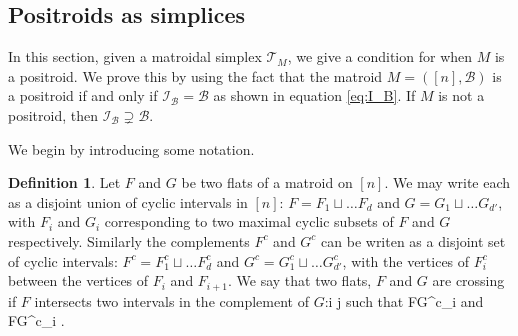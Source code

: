\documentclass[11pt]{article}
\def\bas #1\eas{\begin{align*} #1 \end{align*}}
\newcommand{\cI}{\mathcal{I}}
\newcommand{\cB}{\mathcal{B}}
\newcommand{\cT}{\mathcal{T}}
\theoremstyle{remark}
\theoremstyle{definition}
\newtheorem{dfn}[thm]{Definition}
\begin{document}
\subsection{Positroids as simplices}

In this section, given a matroidal simplex $\cT_M$, we give a condition for when $M$ is a positroid. We prove this by using the fact that the matroid $M = ([n], \cB)$ is a positroid if and only if $\cI_\cB = \cB$ as shown in equation \eqref{eq:I_B}. If $M$ is not a positroid, then $\cI_\cB \supsetneq \cB$. 

We begin by introducing some notation.

\begin{dfn}
Let $F$ and $G$ be two flats of a matroid on $[n]$. We may write each as a disjoint union of cyclic intervals in $[n]$: $F = F_1\sqcup \ldots F_d$ and $G = G_1\sqcup \ldots G_{d'}$, with $F_i$ and $G_i$ corresponding to two maximal cyclic subsets of $F$ and $G$ respectively. Similarly the complements $F^c$ and $G^c$ can be writen as a disjoint set of cyclic intervals: $F^c = F^c_1\sqcup \ldots F^c_d$ and $G^c = G^c_1\sqcup \ldots G^c_{d'}$, with the vertices of $F^c_i$ between the vertices of $F_{i}$ and $F_{i+1}$. We say that two flats, $F$ and $G$ are crossing if $F$ intersects two intervals in the complement of $G$:\bas \exists i \neq j  \textrm{ such that } F\cap G^c_{i} \neq \emptyset \textrm{ and } F\cap G^c_{i} \neq \emptyset. \eas
\end{dfn}
\end{document}
